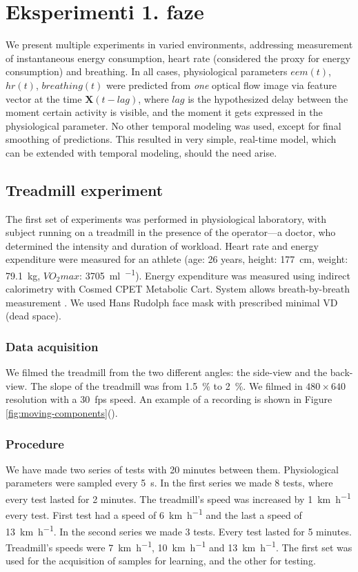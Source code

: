 \section{Eksperimenti 1. faze}

We present multiple experiments in varied environments, addressing measurement of instantaneous energy consumption, heart rate (considered the proxy for energy consumption) and breathing. In all cases, physiological parameters $eem(t)$, $hr(t)$, $breathing(t)$ were predicted from \emph{one} optical flow image via feature vector at the time $\mathbf{X}(t-lag)$, where $lag$ is the hypothesized delay between the moment certain activity is visible, and the moment it gets expressed in the physiological parameter. No other temporal modeling was used, except for final smoothing of predictions. This resulted in very simple, real-time model, which can be extended with temporal modeling, should the need arise.

\subsection{Treadmill experiment}
The first set of experiments was performed in physiological laboratory, with subject running on a treadmill in the presence of the operator---a doctor, who determined the intensity and duration of workload. Heart rate and energy expenditure were measured for an athlete (age: 26 years, height: \SI{177}{\cm}, weight: \SI{79.1}{\kg}, $VO_2max$: \SI{3705}{\ml\per\min}). Energy expenditure was measured using indirect calorimetry with Cosmed CPET Metabolic Cart. System allows breath-by-breath measurement \cite{beaver1973line}. We used Hans Rudolph face mask with prescribed minimal VD (dead space).

\subsubsection{Data acquisition}
We filmed the treadmill from the two different angles: the side-view and the back-view. The slope of the treadmill was from \SI{1.5}{\%} to \SI{2}{\%}. We filmed in $480 \times 640$ resolution with a \SI{30}{fps} speed. An example of a recording is shown in Figure \ref{fig:moving-components}().

\subsubsection{Procedure}
We have made two series of tests with 20 minutes between them. Physiological parameters were sampled every \SI{5}{\s}. In the first series we made 8 tests, where every test lasted for 2 minutes. The treadmill's speed was increased by \SI{1}{\km\per\hour} every test. First test had a speed of \SI{6}{\km\per\hour} and the last a speed of \SI{13}{\km\per\hour}. In the second series we made 3 tests. Every test lasted for 5 minutes. Treadmill's speeds were \SI{7}{\km\per\hour}, \SI{10}{\km\per\hour} and \SI{13}{\km\per\hour}. The first set was used for the acquisition of samples for learning, and the other for testing.

